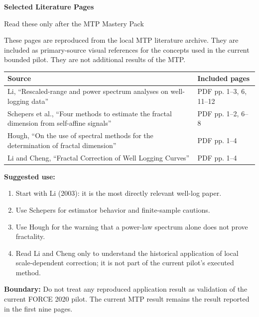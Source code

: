\documentclass[11pt,a4paper]{article}
\begin{document}
\thispagestyle{empty}
\begin{center}
\vspace*{1.2cm}
{\Huge\bfseries\color{Navy} Selected Literature Pages\par}
\vspace{0.4cm}
{\Large\color{Teal} Read these only after the MTP Mastery Pack\par}
\vspace{0.9cm}
\end{center}
These pages are reproduced from the local MTP literature archive. They are included as primary-source visual references for the concepts used in the current bounded pilot. They are not additional results of the MTP.

\vspace{0.3cm}
\begin{tabular}{p{}p{}}
\toprule
\textbf{Source} & \textbf{Included pages}\\
\midrule
Li, ``Rescaled-range and power spectrum analyses on well-logging data'' & PDF pp. 1--3, 6, 11--12\\
Schepers et al., ``Four methods to estimate the fractal dimension from self-affine signals'' & PDF pp. 1--2, 6--8\\
Hough, ``On the use of spectral methods for the determination of fractal dimension'' & PDF pp. 1--4\\
Li and Cheng, ``Fractal Correction of Well Logging Curves'' & PDF pp. 1--4\\
\bottomrule
\end{tabular}

\vspace{0.7cm}
\textbf{Suggested use:}
\begin{enumerate}[itemsep=2pt]
\item Start with Li (2003): it is the most directly relevant well-log paper.
\item Use Schepers for estimator behavior and finite-sample cautions.
\item Use Hough for the warning that a power-law spectrum alone does not prove fractality.
\item Read Li and Cheng only to understand the historical application of local scale-dependent correction; it is not part of the current pilot's executed method.
\end{enumerate}

\vfill
\textbf{Boundary:} Do not treat any reproduced application result as validation of the current FORCE 2020 pilot. The current MTP result remains the result reported in the first nine pages.
\end{document}
